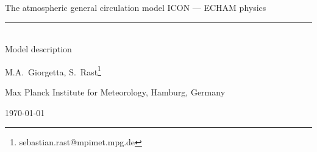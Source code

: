 \documentclass[DIV14,BCOR1cm,11pt,a4paper,twoside]{scrreprt}
\begin{document}
\thispagestyle{empty}

\renewcommand{\footnoterule}{\rule{0pt}{0pt}\vspace{0pt}}


\vspace{3cm}

\begin{center}
{ 
The atmospheric general circulation model ICON --- ECHAM physics\\[0.5ex]
\rule{5cm}{0.7mm}\\[2.5ex]
Model description
}
\end{center}

\vspace{3cm}

\begin{center}
{ 
M.A.~Giorgetta, S.~Rast\footnote{sebastian.rast@mpimet.mpg.de}}

\end{center}

\vspace{2cm}

\begin{center}
{ 
Max Planck Institute for Meteorology, Hamburg, Germany\\

\vspace{2cm}

\today}
\end{center}
\newpage
\rule{0cm}{1cm}
\thispagestyle{empty}
\newpage


\tableofcontents

\listoftables

\listoffigures
\end{document}
